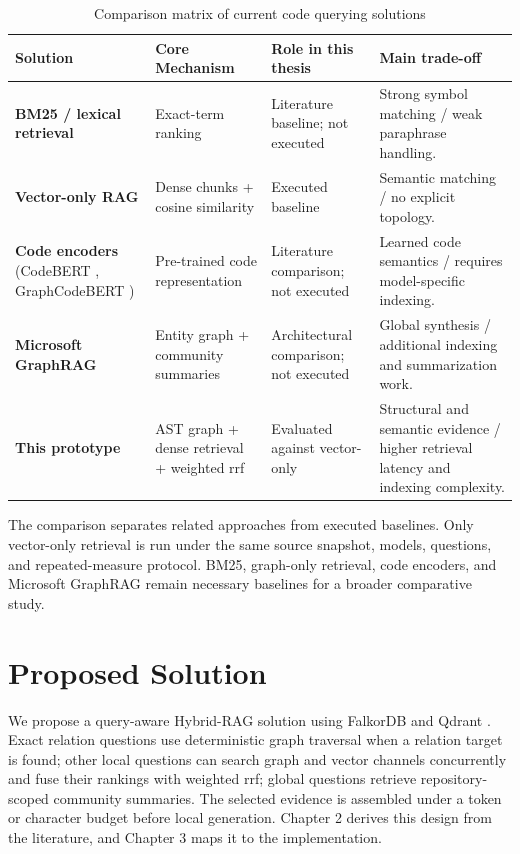 \documentclass[12pt,letterpaper,oneside]{report}
\begin{document}
\begin{table}[H]
    \centering
    \caption{Comparison matrix of current code querying solutions}
    \label{tab:related_works}
    \small
    \begin{tabular}{p{2.5cm}p{3cm}p{3cm}p{4.5cm}}
        \toprule
        \textbf{Solution} & \textbf{Core Mechanism} & \textbf{Role in this thesis} & \textbf{Main trade-off} \\
        \midrule
        \textbf{BM25 / lexical retrieval} \cite{bm25} & Exact-term ranking & Literature baseline; not executed & Strong symbol matching / weak paraphrase handling. \\
        \midrule
        \textbf{Vector-only RAG} \cite{lewis2020rag} & Dense chunks + cosine similarity & Executed baseline & Semantic matching / no explicit topology. \\
        \midrule
        \textbf{Code encoders} (CodeBERT \cite{feng2020codebert}, GraphCodeBERT \cite{guo2024graphcodebert}) & Pre-trained code representation & Literature comparison; not executed & Learned code semantics / requires model-specific indexing. \\
        \midrule
        \textbf{Microsoft GraphRAG} \cite{edge2024graphrag} & Entity graph + community summaries & Architectural comparison; not executed & Global synthesis / additional indexing and summarization work. \\
        \midrule
        \textbf{This prototype} & AST graph + dense retrieval + weighted \gls{rrf} & Evaluated against vector-only & Structural and semantic evidence / higher retrieval latency and indexing complexity. \\
        \bottomrule
    \end{tabular}
\end{table}

The comparison separates related approaches from executed baselines. Only vector-only retrieval is run under the same source snapshot, models, questions, and repeated-measure protocol. BM25, graph-only retrieval, code encoders, and Microsoft GraphRAG remain necessary baselines for a broader comparative study.

\section{Proposed Solution}
We propose a query-aware Hybrid-RAG solution using FalkorDB \cite{falkordb2024} and Qdrant \cite{qdrant2024}. Exact relation questions use deterministic graph traversal when a relation target is found; other local questions can search graph and vector channels concurrently and fuse their rankings with weighted \gls{rrf}; global questions retrieve repository-scoped community summaries. The selected evidence is assembled under a token or character budget before local generation. Chapter 2 derives this design from the literature, and Chapter 3 maps it to the implementation.
\end{document}
